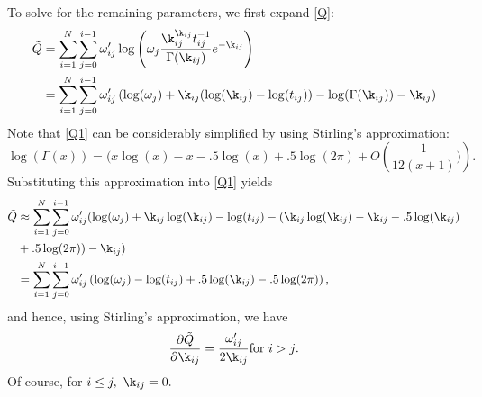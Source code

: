 \documentclass[12pt,leqno]{article}
\begin{document}
To solve for the remaining parameters, we first expand \eqref{Q}:
\begin{equation}\label{Q1}
  \begin{split}
    \tilde{Q} &= \sum_{i=1}^N\sum_{j=0}^{i-1}\omega'_{ij}\log\left(\omega_j\frac{\k_{ij}^{\k_{ij}}t_{ij}^{-1}}
          {\Gamma(\k_{ij})}e^{-\k_{ij}} \right)\\
    &= \sum_{i=1}^N\sum_{j=0}^{i-1}\omega'_{ij}\left(\log(\omega_j)+\k_{ij}(\log(\k_{ij}) - \log(t_{ij})) 
          -\log(\Gamma(\k_{ij})) -\k_{ij}\right)\\
  \end{split}
\end{equation}
Note that \eqref{Q1} can be considerably simplified by using Stirling's approximation:
\begin{equation}\label{stirling}
  \log(\Gamma(x)) =  (x\log(x) -x - .5\log(x) + .5\log(2\pi) + O\left(\frac{1}{12(x+1)})\right).%
\end{equation}
Substituting this approximation into \eqref{Q1} yields
\begin{equation}\label{Q2}
  \begin{split}
    \tilde{Q} &\approx \sum_{i=1}^N\sum_{j=0}^{i-1}\omega'_{ij}(\log(\omega_j)+\k_{ij}\log(\k_{ij}) - \log(t_{ij})
    -(\k_{ij}\log(\k_{ij}) -\k_{ij} -.5\log(\k_{ij}) \\
    &+ .5\log(2\pi)) -\k_{ij})\\
  &= \sum_{i=1}^N\sum_{j=0}^{i-1}\omega'_{ij}\left(\log(\omega_j) - \log(t_{ij}) + .5\log(\k_{ij})
  - .5\log(2\pi) \right),
  \end{split}
\end{equation}
and hence, using Stirling's approximation, we have 
\begin{equation}\label{dQ_dk}
  \frac{\partial\tilde{Q}}{\partial\k_{ij}} = \frac{\omega'_{ij}}{2\k_{ij}}\text{for $i > j$.}
\end{equation}
Of course, for $i \le j,~\k_{ij} = 0.$
\end{document}
